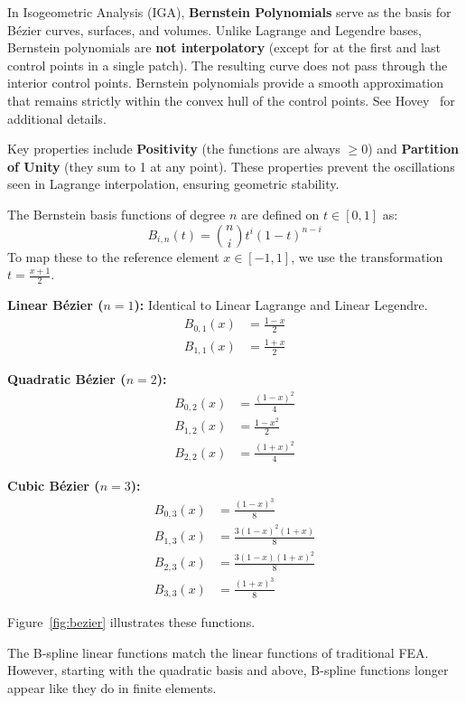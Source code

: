 \documentclass[12pt,report,justified]{SANDreport}
\begin{document}
In Isogeometric Analysis (IGA), {\bf Bernstein Polynomials} serve as the basis for B{\'e}zier curves, surfaces, and volumes. Unlike Lagrange and Legendre bases, Bernstein polynomials are {\bf not interpolatory} (except for at the first and last control points in a single patch).  The resulting curve does not pass through the interior control points.  Bernstein polynomials provide a smooth approximation that remains strictly within the convex hull of the control points.  See Hovey~\cite{Hovey2022Bezier} for additional details.

Key properties include {\bf Positivity} (the functions are always $\geq 0$) and {\bf Partition of Unity} (they sum to 1 at any point). These properties prevent the oscillations seen in Lagrange interpolation, ensuring geometric stability.

The Bernstein basis functions of degree $n$ are defined on $t \in [0, 1]$ as:
\begin{equation}
B_{i,n}(t) = \binom{n}{i} t^i (1-t)^{n-i}
\end{equation}
To map these to the reference element $x \in [-1, 1]$, we use the transformation $t = \frac{x+1}{2}$.

{\bf Linear B{\'e}zier ($n=1$):} Identical to Linear Lagrange and Linear Legendre.
\begin{align}
B_{0,1}(x) &= \frac{1-x}{2} \\
B_{1,1}(x) &= \frac{1+x}{2}
\end{align}

{\bf Quadratic B{\'e}zier ($n=2$):}
\begin{align}
B_{0,2}(x) &= \frac{(1-x)^2}{4} \\
B_{1,2}(x) &= \frac{1-x^2}{2} \\
B_{2,2}(x) &= \frac{(1+x)^2}{4}
\end{align}

{\bf Cubic B{\'e}zier ($n=3$):}
\begin{align}
B_{0,3}(x) &= \frac{(1-x)^3}{8} \\
B_{1,3}(x) &= \frac{3(1-x)^2(1+x)}{8} \\
B_{2,3}(x) &= \frac{3(1-x)(1+x)^2}{8} \\
B_{3,3}(x) &= \frac{(1+x)^3}{8}
\end{align}

Figure~{\ref{fig:bezier}} illustrates these functions.

The B-spline linear functions match the linear functions of traditional FEA.
However, starting with the quadratic basis and above, B-spline functions longer appear like they do in finite elements.  
\end{document}
